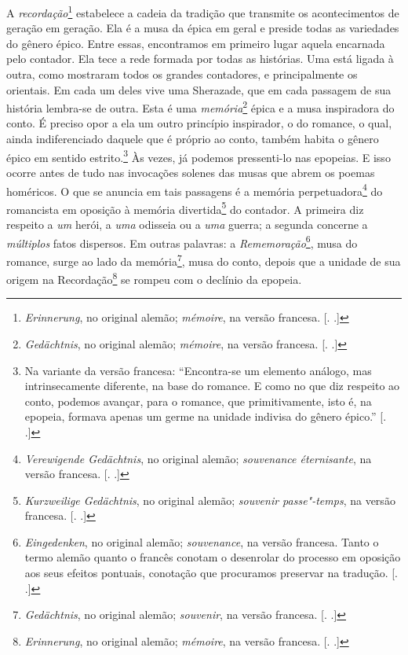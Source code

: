 A \emph{recordação}\footnote{\emph{Erinnerung}, no original alemão;
  \emph{mémoire}, na versão francesa. [. .]} estabelece a
cadeia da tradição que transmite os acontecimentos de geração em
geração. Ela é a musa da épica em geral e preside todas as variedades do
gênero épico. Entre essas, encontramos em primeiro lugar aquela
encarnada pelo contador. Ela tece a rede formada por todas as histórias.
Uma está ligada à outra, como mostraram todos os grandes contadores, e
principalmente os orientais. Em cada um deles vive uma Sherazade, que em
cada passagem de sua história lembra-se de outra. Esta é uma
\emph{memória}\footnote{\emph{Gedächtnis}, no original alemão;
  \emph{mémoire}, na versão francesa. [. .]} épica e a musa
inspiradora do conto. É preciso opor a ela um outro princípio
inspirador, o do romance, o qual, ainda indiferenciado daquele que é
próprio ao conto, também habita o gênero épico em sentido
estrito.\footnote{Na variante da versão francesa: ``Encontra-se um
  elemento análogo, mas intrinsecamente diferente, na base do romance. E
  como no que diz respeito ao conto, podemos avançar, para o romance,
  que primitivamente, isto é, na epopeia, formava apenas um germe na
  unidade indivisa do gênero épico.'' [. .]} Às vezes, já
podemos pressenti-lo nas epopeias. E isso ocorre antes de tudo nas
invocações solenes das musas que abrem os poemas homéricos. O que se
anuncia em tais passagens é a memória perpetuadora\footnote{\emph{Verewigende
  Gedächtnis}, no original alemão; \emph{souvenance éternisante}, na
  versão francesa. [. .]} do romancista em oposição à memória
divertida\footnote{\emph{Kurzweilige Gedächtnis}, no original alemão;
  \emph{souvenir passe"-temps}, na versão francesa. [. .]} do
contador. A primeira diz respeito a \emph{um} herói, a \emph{uma}
odisseia ou a \emph{uma} guerra; a segunda concerne a \emph{múltiplos}
fatos dispersos. Em outras palavras: a \emph{Rememoração}\footnote{\emph{Eingedenken},
  no original alemão; \emph{souvenance}, na versão francesa. Tanto o
  termo alemão quanto o francês conotam o desenrolar do processo em
  oposição aos seus efeitos pontuais, conotação que procuramos preservar
  na tradução. [. .]}, musa do romance, surge ao lado da
memória\footnote{\emph{Gedächtnis}, no original alemão; \emph{souvenir},
  na versão francesa. [. .]}, musa do conto, depois que a
unidade de sua origem na Recordação\footnote{\emph{Erinnerung}, no
  original alemão; \emph{mémoire}, na versão francesa. [. .]}
se rompeu com o declínio da epopeia.

